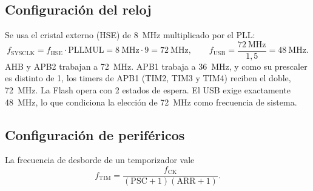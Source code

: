 \subsection{Configuración del reloj}
Se usa el cristal externo (HSE) de \SI{8}{\mega\hertz} multiplicado por el PLL:
\begin{equation}
  f_{\mathrm{SYSCLK}} = f_{\mathrm{HSE}}\cdot \mathrm{PLLMUL} = \SI{8}{\mega\hertz}\cdot 9 = \SI{72}{\mega\hertz},
  \qquad
  f_{\mathrm{USB}} = \frac{\SI{72}{\mega\hertz}}{1{,}5} = \SI{48}{\mega\hertz}.
\end{equation}
AHB y APB2 trabajan a \SI{72}{\mega\hertz}. APB1 trabaja a \SI{36}{\mega\hertz}, y como su
prescaler es distinto de 1, los timers de APB1 (TIM2, TIM3 y TIM4) reciben el doble,
\SI{72}{\mega\hertz}. La Flash opera con 2 estados de espera. El USB exige exactamente
\SI{48}{\mega\hertz}, lo que condiciona la elección de 72~MHz como frecuencia de sistema.

\subsection{Configuración de periféricos}
La frecuencia de desborde de un temporizador vale
\begin{equation}
  f_{\mathrm{TIM}} = \frac{f_{\mathrm{CK}}}{(\mathrm{PSC}+1)(\mathrm{ARR}+1)}.
  \label{eq:ftim}
\end{equation}

